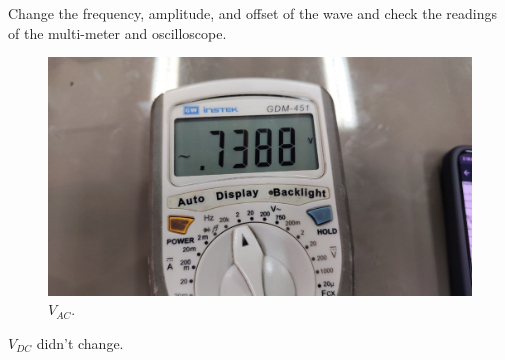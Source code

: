 \documentclass[11pt]{article}
\newcommand{\PicScale}{0.2}
\begin{document}
\begin{question}
\begin{subquestion}{Change the frequency, amplitude, and offset of the wave and check the readings of the multi-meter and oscilloscope.}
{    \begin{figure}[H]
        \begin{center}
            \includegraphics[scale=\PicScale]{Fig/23.jpeg}
            \caption{$V_{AC}$.}
        \end{center}
    \end{figure}
    $V_{DC}$ didn't change.

}
\end{subquestion}
\end{question}
\end{document}
